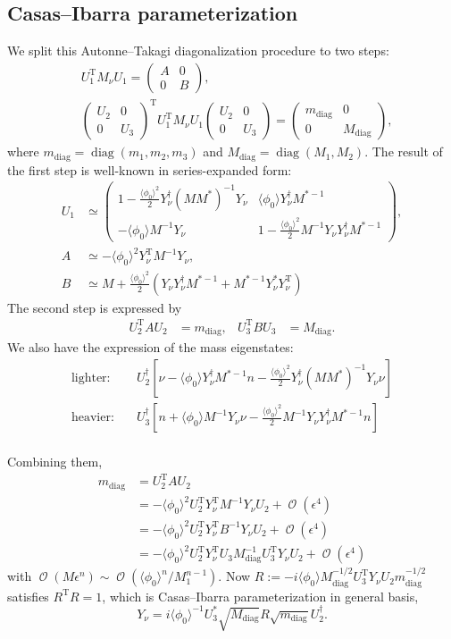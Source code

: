 \documentclass[english,11pt,a4paper]{article}
\numberwithin{equation}{section}  %
\newcommand\w[1]{_{\mathrm{#1}}}
\newcommand\pmat[1]{\begin{pmatrix}#1\end{pmatrix}} %
\DeclareMathOperator{\Order}{\mathcal{O}}
\newcommand\vev[1]{\langle#1\rangle}
\newcommand\YN{Y_\nu}
\newcommand{\trans}{^{\mathrm T}}
\newcommand{\spmat}[1]{\left(\begin{smallmatrix}#1\end{smallmatrix}\right)}
\DeclareMathOperator{\diag}{\mathrm{diag}}
\begin{document}
\subsection{Casas--Ibarra parameterization}
We split this Autonne--Takagi diagonalization procedure to two steps:
\begin{align}
   &U_1\trans  M_\nu U_1 = \spmat{A& 0 \\ 0&B},\\
   &\spmat{U_2&0\\0&U_3}\trans U_1\trans M_\nu U_1 \spmat{U_2&0\\0&U_3} = \spmat{m\w{diag} & 0 \\ 0 & M\w{diag}},
\end{align}
where $m\w{diag}=\diag(m_1, m_2, m_3)$ and $M\w{diag}=\diag(M_1, M_2)$.
The result of the first step is well-known in series-expanded form:
\begin{align}
U_1 &\simeq \pmat{
  1 - \frac{\vev{\phi_0}^2}{2}\YN^\dagger (MM^*)^{-1}\YN &
 \vev{\phi_0} \YN^\dagger M^{*-1}
\\
-\vev{\phi_0} M^{-1}\YN &
  1 - \frac{\vev{\phi_0}^2}{2} M^{-1}\YN\YN^\dagger M^{*-1}
},\\
 A &\simeq -\vev{\phi_0}^2 \YN\trans M^{-1} \YN,\\
 B &\simeq M + \frac{\vev{\phi_0}^2}{2} \left( \YN\YN^\dagger M^{*-1} + M^{*-1} \YN^* \YN\trans\right)
\end{align}
The second step is expressed by
\begin{align}
 U_2\trans A U_2 &= m\w{diag}, &
 U_3\trans B U_3 &= M\w{diag}.
\end{align}
We also have the expression of the mass eigenstates:
\begin{align}
 \text{lighter}:&\quad
  U_2^\dagger\left[
\nu
-\vev{\phi_0} \YN^\dagger M^{*-1} n
-\frac{\vev{\phi_0}^2}{2} \YN^\dagger (MM^*)^{-1}\YN\nu
\right]\\
 \text{heavier}:&\quad
  U_3^\dagger\left[
n
+\vev{\phi_0} M^{-1}\YN\nu
-\frac{\vev{\phi_0}^2}{2} M^{-1}\YN\YN^\dagger M^{*-1}n
\right]\\
\end{align}

Combining them,
\begin{align}
 m\w{diag} &=  U_2\trans A U_2\\
&= -\vev{\phi_0}^2U_2\trans \YN\trans M^{-1} \YN U_2 + \Order(\epsilon^4)\\
&=-\vev{\phi_0}^2U_2\trans \YN\trans B^{-1} \YN U_2 + \Order(\epsilon^4)\\
&=-\vev{\phi_0}^2U_2\trans \YN\trans U_3 M\w{diag}^{-1}U_3\trans \YN U_2 + \Order(\epsilon^4)
\end{align}
with $\Order(M\epsilon^n)\sim\Order(\vev{\phi_0}^n/M_1^{n-1})$.
Now $R:=-i\vev{\phi_0}M\w{diag}^{-1/2} U_3\trans Y_\nu U_2 m\w{diag}^{-1/2}$ satisfies $R\trans R=1$, which is Casas--Ibarra parameterization in general basis,
\begin{equation}
 Y_\nu = i\vev{\phi_0}^{-1}U_3^* \sqrt{M\w{diag}}R\sqrt{m\w{diag}}U_2^\dagger.
\end{equation}
\end{document}
